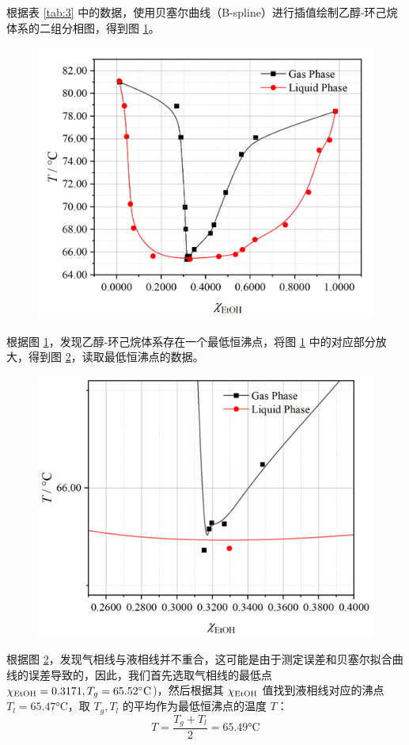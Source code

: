 根据表 \ref{tab:3} 中的数据，使用贝塞尔曲线（B-spline）进行插值绘制乙醇-环己烷体系的二组分相图，得到图 \ref{fig:2}。

\begin{figure}[htbp]
    \centering
    \includegraphics[width=.7\textwidth]{figures/1-2.png}
    \label{fig:2}
\end{figure}

根据图 \ref{fig:2}，发现乙醇-环己烷体系存在一个最低恒沸点，将图 \ref{fig:2} 中的对应部分放大，得到图 \ref{fig:3}，读取最低恒沸点的数据。

\begin{figure}[htbp]
    \centering
    \includegraphics[width=.7\textwidth]{figures/1-3.png}
    \label{fig:3}
\end{figure}

根据图 \ref{fig:3}，发现气相线与液相线并不重合，这可能是由于测定误差和贝塞尔拟合曲线的误差导致的，因此，我们首先选取气相线的最低点 $\chi_{\rm{EtOH}}=0.3171, T_g = 65.52\si{\celsius}$)，然后根据其 $\chi_{\rm{EtOH}}$ 值找到液相线对应的沸点 $T_l = 65.47\si{\celsius}$，取 $T_g,T_l$ 的平均作为最低恒沸点的温度 $T$：
\[
T = \frac{T_g+T_l}{2}=65.49\si{\celsius}
\]




